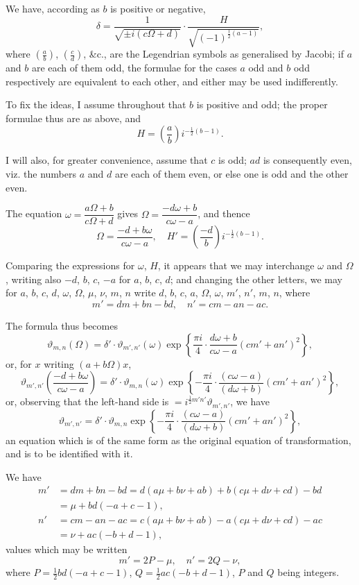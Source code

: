 \documentclass[11pt,a4paper]{article}
\theoremstyle{definition}
\begin{document}
We have, according as $b$ is positive or negative,
\[
\delta = \frac{1}{\sqrt{\pm i(c\Omega + d)}} \cdot \frac{H}{\sqrt{(-1)^{\frac{1}{2}(a-1)}}},
\]
where $\left(\frac{a}{b}\right)$, $\left(\frac{c}{d}\right)$, \&c., are the Legendrian symbols as generalised by Jacobi; if $a$ and $b$ are each of them odd, the formulae for the cases $a$ odd and $b$ odd respectively are equivalent to each other, and either may be used indifferently.

To fix the ideas, I assume throughout that $b$ is positive and odd; the proper formulae thus are as above, and
\[
H = \left(\frac{a}{b}\right)i^{-\frac{1}{2}(b-1)}.
\]

I will also, for greater convenience, assume that $c$ is odd; $ad$ is consequently even, viz. the numbers $a$ and $d$ are each of them even, or else one is odd and the other even.

The equation $\omega = \dfrac{a\Omega + b}{c\Omega + d}$ gives $\Omega = \dfrac{-d\omega + b}{c\omega - a}$, and thence
\[
\Omega = \frac{-d + b\omega}{c\omega - a}, \quad H' = \left(\frac{-d}{b}\right)i^{-\frac{1}{2}(b-1)}.
\]

Comparing the expressions for $\omega$, $H$, it appears that we may interchange $\omega$ and $\Omega$, writing also $-d$, $b$, $c$, $-a$ for $a$, $b$, $c$, $d$; and changing the other letters, we may for $a$, $b$, $c$, $d$, $\omega$, $\Omega$, $\mu$, $\nu$, $m$, $n$ write $d$, $b$, $c$, $a$, $\Omega$, $\omega$, $m'$, $n'$, $m$, $n$, where
\[
m' = dm + bn - bd, \quad n' = cm - an - ac.
\]

The formula thus becomes
\[
\vartheta_{m,n}(\Omega) = \delta' \cdot \vartheta_{m',n'}(\omega) \exp\left\{\frac{\pi i}{4}\cdot\frac{d\omega + b}{c\omega - a}(cm' + an')^2\right\},
\]
or, for $x$ writing $(a + b\Omega)x$,
\[
\vartheta_{m',n'}\left(\frac{-d + b\omega}{c\omega - a}\right) = \delta' \cdot \vartheta_{m,n}(\omega) \exp\left\{-\frac{\pi i}{4}\cdot\frac{(c\omega - a)}{(d\omega + b)}(cm' + an')^2\right\},
\]
or, observing that the left-hand side is $= i^{\frac{1}{2}m'n'}\vartheta_{m',n'}$, we have
\[
\vartheta_{m',n'} = \delta' \cdot \vartheta_{m,n} \exp\left\{-\frac{\pi i}{4}\cdot\frac{(c\omega - a)}{(d\omega + b)}(cm' + an')^2\right\},
\]
an equation which is of the same form as the original equation of transformation, and is to be identified with it.

We have
\begin{align*}
m' &= dm + bn - bd = d(a\mu + b\nu + ab) + b(c\mu + d\nu + cd) - bd \\
&= \mu + bd(-a + c - 1),\\
n' &= cm - an - ac = c(a\mu + b\nu + ab) - a(c\mu + d\nu + cd) - ac \\
&= \nu + ac(-b + d - 1),
\end{align*}
values which may be written
\[
m' = 2P - \mu, \quad n' = 2Q - \nu,
\]
where $P = \frac{1}{2}bd(-a + c - 1)$, $Q = \frac{1}{2}ac(-b + d - 1)$, $P$ and $Q$ being integers.
\end{document}
